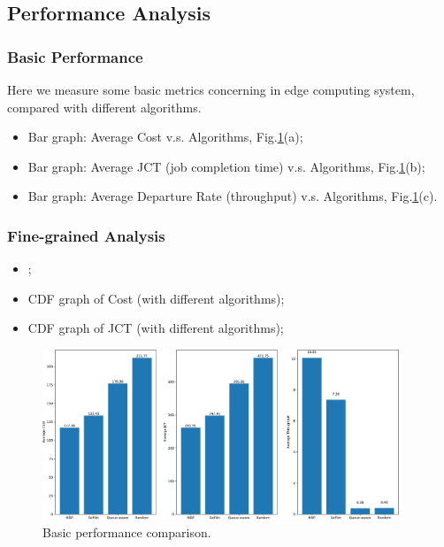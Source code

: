 \subsection{Performance Analysis}
    \subsubsection{Basic Performance}
    Here we measure some basic metrics concerning in edge computing system, compared with different algorithms.
    \begin{itemize}
        \item Bar graph: Average Cost v.s. Algorithms, Fig.\ref{fig:bar_plot}(a);
        \item Bar graph: Average JCT (job completion time) v.s. Algorithms, Fig.\ref{fig:bar_plot}(b); %
        \item Bar graph: Average Departure Rate (throughput) v.s. Algorithms, Fig.\ref{fig:bar_plot}(c). 
    \end{itemize}

    \subsubsection{Fine-grained Analysis}
    \begin{itemize}
        \item {};
        \item CDF graph of Cost (with different algorithms);
        \item CDF graph of JCT (with different algorithms);
    \end{itemize}

    \begin{figure}[htp!]
        \centering
        \includegraphics[width=0.95\textwidth]{images/bar_graph.pdf}
        \caption{Basic performance comparison.}
        \label{fig:bar_plot}
    \end{figure}

